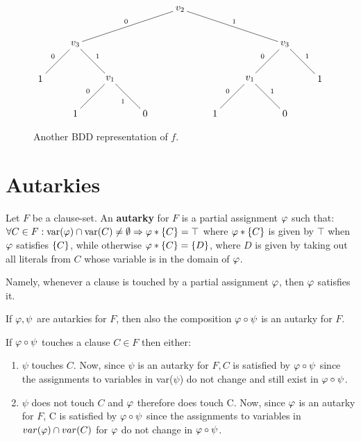 \documentclass[12pt]{book}
\begin{document}
\begin{examp}
\begin{figure}[h]
  \centering
  \begin{displaymath}
    \xygraph{
      []{v_2} ( 
        - [dlll]{v_3}_0 (
          - [dl]{1}_0 (),
          - [dr]{v_1}^1 (
            - [dl]{1}_0 (),
            - [dr]{0}_1 ()
          )
        ),
        - [drrr]{v_3}^1 (
          - [dl]{v_1}_0 (
            - [dl]{1}_0 (),
            - [dr]{0}^1 ()
          ),
          -[dr]{1}^1 ()
          )
        )
      }
  \end{displaymath}
  \caption{Another BDD representation of $f$.}
  \label{fig:BooleanFunctionDTExampDT2}
\end{figure}
\end{examp}

\section{Autarkies}
\label{sec:Autarkies}

\begin{defi}\label{def:autarky}
  Let $F$ be a clause-set. An \textbf{autarky} for $F$ is a partial assignment $\varphi$ such that: $\forall C \in F : \operatorname{var}(\varphi) \cap \operatorname{var}(C) \neq \emptyset \Rightarrow \varphi * \{ C \} = \top$ where $\varphi * \{ C \}$ is given by $\top$ when $\varphi$ satisfies $\{ C \}$, while otherwise $\varphi * \{ C \} = \{ D \}$, where $D$ is given by taking out all literals from $C$ whose variable is in the domain of $\varphi$.
\end{defi}
Namely, whenever a clause is touched by a partial assignment $\varphi$, then $\varphi$ satisfies it.

\begin{lem}\label{lem:compaut}
  If $\varphi, \psi$ are autarkies for $F$, then also the composition $\varphi \circ \psi$ is an autarky for $F$.
\end{lem}
\pr If $\varphi \circ \psi$ touches a clause $C \in F$ then either:
\begin{enumerate}
\item $\psi$ touches $C$. Now, since $\psi$ is an autarky for $F, C$ is satisfied by $\varphi \circ \psi$ since the assignments to variables in var($\psi$) do not  change and still exist in $\varphi \circ \psi$.
\item $\psi$ does not touch $C$ and $\varphi$ therefore does touch C. Now, since $\varphi$ is an autarky for $F$, C is satisfied by $\varphi \circ \psi$ since the assignments to variables in $var(\varphi) \cap var(C)$ for $\varphi$ do not change in $\varphi \circ \psi$. 
\end{enumerate}
\end{document}
